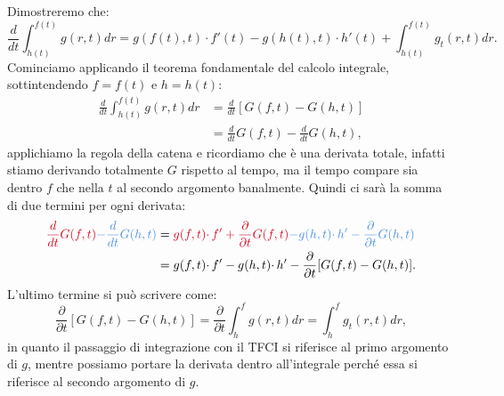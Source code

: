 \documentclass[10pt,a4paper,twoside,openright]{book}
\begin{document}
\begin{nb}
	Dimostreremo che:
	\begin{equation*}
		\frac{d}{dt}\int _{h( t)}^{f( t)} g( r,t) dr=g( f( t) ,t) \cdotp f'( t) -g( h( t) ,t) \cdotp h'( t) +\int _{h( t)}^{f( t)} g_{t}( r,t) dr.
	\end{equation*}
	Cominciamo applicando il teorema fondamentale del calcolo integrale, sottintendendo $f=f( t)$ e $h=h( t)$:
	\begin{align*}
	\frac{d}{dt}\int _{h( t)}^{f( t)} g( r,t) dr & =\frac{d}{dt}[ G( f,t) -G( h,t)]\\
	 											 & =\frac{d}{dt} G( f,t) -\frac{d}{dt} G( h,t) ,
	\end{align*}
	applichiamo la regola della catena e ricordiamo che è una derivata totale, infatti stiamo derivando totalmente $G$ rispetto al tempo, ma il tempo compare sia dentro $f$ che nella $t$ al secondo argomento banalmente. Quindi ci sarà la somma di due termini per ogni derivata:
	\begin{align*}
		\textcolor[rgb]{0.82,0.01,0.11}{\frac{d}{dt} G( f,t)}\textcolor[rgb]{0.29,0.56,0.89}{-\frac{d}{dt} G( h,t)} & =\textcolor[rgb]{0.82,0.01,0.11}{g( f,t) \cdotp f'+\frac{\partial }{\partial t} G( f,t)}\textcolor[rgb]{0.29,0.56,0.89}{-g( h,t) \cdotp h'-\frac{\partial }{\partial t} G( h,t)}\\
	 																												& =g( f,t) \cdotp f'-g( h,t) \cdotp h'-\frac{\partial }{\partial t}[ G( f,t) -G( h,t)] .
	\end{align*}
	L'ultimo termine si può scrivere come:
	\begin{equation*}
		\frac{\partial }{\partial t}[ G( f,t) -G( h,t)] =\frac{\partial }{\partial t}\int _{h}^{f} g( r,t) dr=\int _{h}^{f} g_{t}( r,t) dr,
	\end{equation*}
	in quanto il passaggio di integrazione con il TFCI si riferisce al primo argomento di $g$, mentre possiamo portare la derivata dentro all'integrale perché essa si riferisce al secondo argomento di $g$.
\end{nb}
\end{document}
